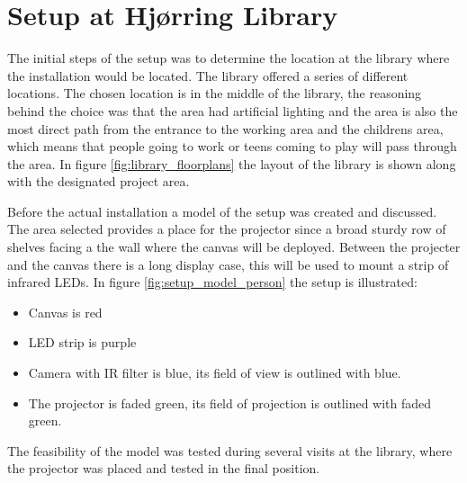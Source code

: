 \section{Setup at Hj{\o}rring Library}

The initial steps of the setup was to determine the location at the library where the installation would be located. The library offered a series of different locations. The chosen location is in the middle of the library, the reasoning behind the choice was that the area had artificial lighting and the area is also the most direct path from the entrance to the working area and the childrens area, which means that people going to work or teens coming to play will pass through the area. In figure \ref{fig:library_floorplans} the layout of the library is shown along with the designated project area.


Before the actual installation a model of the setup was created and discussed. The area selected provides a place for the projector since a broad sturdy row of shelves facing a the wall where the canvas will be deployed. Between the projecter and the canvas there is a long display case, this will be used to mount a strip of infrared LEDs. In figure \ref{fig:setup_model_person} the setup is illustrated:

\begin{itemize}
\item Canvas is red
\item LED strip is purple
\item Camera with IR filter is blue, its field of view is outlined with blue.
\item The projector is faded green, its field of projection is outlined with faded green.
\end{itemize}

The feasibility of the model was tested during several visits at the library, where the projector was placed and tested in the final position. 

